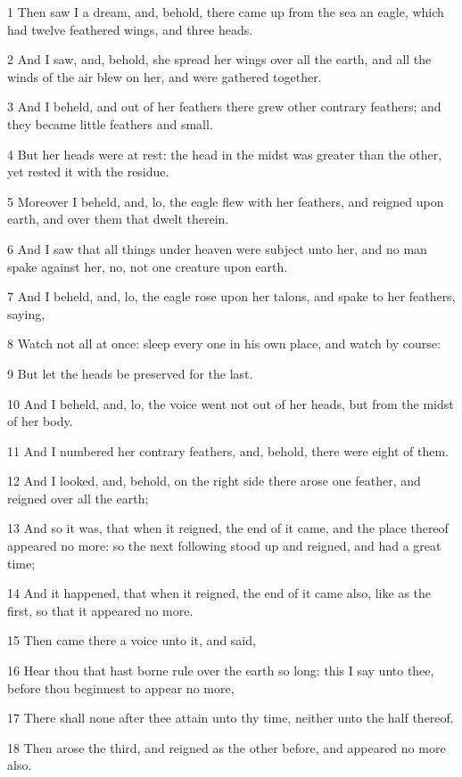 \par 1 Then saw I a dream, and, behold, there came up from the sea an eagle, which had twelve feathered wings, and three heads.
\par 2 And I saw, and, behold, she spread her wings over all the earth, and all the winds of the air blew on her, and were gathered together.
\par 3 And I beheld, and out of her feathers there grew other contrary feathers; and they became little feathers and small.
\par 4 But her heads were at rest: the head in the midst was greater than the other, yet rested it with the residue.
\par 5 Moreover I beheld, and, lo, the eagle flew with her feathers, and reigned upon earth, and over them that dwelt therein.
\par 6 And I saw that all things under heaven were subject unto her, and no man spake against her, no, not one creature upon earth.
\par 7 And I beheld, and, lo, the eagle rose upon her talons, and spake to her feathers, saying,
\par 8 Watch not all at once: sleep every one in his own place, and watch by course:
\par 9 But let the heads be preserved for the last.
\par 10 And I beheld, and, lo, the voice went not out of her heads, but from the midst of her body.
\par 11 And I numbered her contrary feathers, and, behold, there were eight of them.
\par 12 And I looked, and, behold, on the right side there arose one feather, and reigned over all the earth;
\par 13 And so it was, that when it reigned, the end of it came, and the place thereof appeared no more: so the next following stood up and reigned, and had a great time;
\par 14 And it happened, that when it reigned, the end of it came also, like as the first, so that it appeared no more.
\par 15 Then came there a voice unto it, and said,
\par 16 Hear thou that hast borne rule over the earth so long: this I say unto thee, before thou beginnest to appear no more,
\par 17 There shall none after thee attain unto thy time, neither unto the half thereof.
\par 18 Then arose the third, and reigned as the other before, and appeared no more also.
